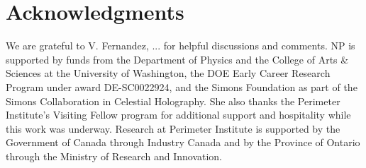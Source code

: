 \documentclass[../main.tex]{subfiles}
\begin{document}
%
%
%
%

\section{Acknowledgments}

We are grateful to V. Fernandez, ... for helpful discussions and comments. NP is supported by funds from the Department of Physics and the College of Arts \& Sciences at the University of Washington, the DOE Early Career Research Program under award DE-SC0022924, and the Simons Foundation as part of the Simons Collaboration in Celestial Holography. She also thanks the Perimeter Institute's Visiting Fellow program for additional support and hospitality while this work was underway. Research at Perimeter Institute is supported by the Government of Canada through Industry Canada and by the Province of Ontario through the Ministry of Research and Innovation.
\end{document}
